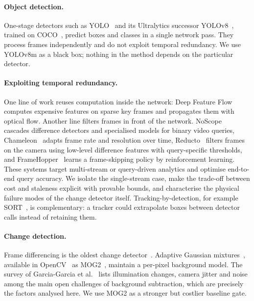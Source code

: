 \documentclass[12pt,a4paper]{article}
\theoremstyle{plain}
\theoremstyle{definition}
\begin{document}
\paragraph{Object detection.} One-stage detectors such as YOLO~\cite{redmon2016yolo} and its Ultralytics successor YOLOv8~\cite{jocher2023yolov8}, trained on COCO~\cite{lin2014coco}, predict boxes and classes in a single network pass. They process frames independently and do not exploit temporal redundancy. We use YOLOv8m as a black box; nothing in the method depends on the particular detector.

\paragraph{Exploiting temporal redundancy.} One line of work reuses computation inside the network: Deep Feature Flow~\cite{zhu2017dff} computes expensive features on sparse key frames and propagates them with optical flow. Another line filters frames in front of the network. NoScope~\cite{kang2017noscope} cascades difference detectors and specialised models for binary video queries, Chameleon~\cite{jiang2018chameleon} adapts frame rate and resolution over time, Reducto~\cite{li2020reducto} filters frames on the camera using low-level difference features with query-specific thresholds, and FrameHopper~\cite{arefeen2022framehopper} learns a frame-skipping policy by reinforcement learning. These systems target multi-stream or query-driven analytics and optimise end-to-end query accuracy. We isolate the single-stream case, make the trade-off between cost and staleness explicit with provable bounds, and characterise the physical failure modes of the change detector itself. Tracking-by-detection, for example SORT~\cite{bewley2016sort}, is complementary: a tracker could extrapolate boxes between detector calls instead of retaining them.

\paragraph{Change detection.} Frame differencing is the oldest change detector~\cite{jain1979difference}. Adaptive Gaussian mixtures~\cite{stauffer1999adaptive}, available in OpenCV~\cite{bradski2000opencv} as MOG2~\cite{zivkovic2004improved}, maintain a per-pixel background model. The survey of Garcia-Garcia et al.~\cite{garcia2020background} lists illumination changes, camera jitter and noise among the main open challenges of background subtraction, which are precisely the factors analysed here. We use MOG2 as a stronger but costlier baseline gate.
\end{document}
